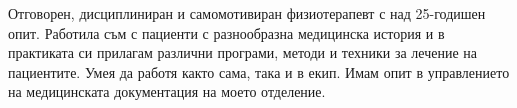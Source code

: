 \vspace{-10mm}
\cventryone
{}
{
Отговорен, дисциплиниран и самомотивиран физиотерапевт с над 25-годишен опит. Работила съм с пациенти с разнообразна медицинска история и в практиката си прилагам различни програми, методи и техники за лечение на пациентите. \newline
Умея да работя както сама, така и в екип. Имам опит в управлението на медицинската документация на моето отделение.
}
\vspace{+4mm}